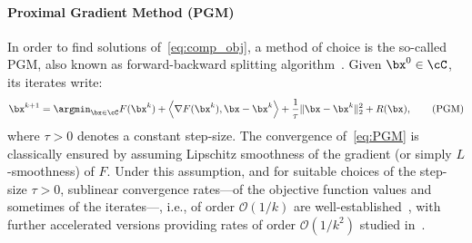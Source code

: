 \documentclass[11pt]{amsart}
\begin{document}
\paragraph{\textbf{Proximal Gradient Method (PGM)}} 
In order to find solutions of~\cref{eq:comp_obj}, a method of choice is the so-called PGM, also known as forward-backward splitting algorithm~\cite{CW2005,lions1979,Passty1979}. Given $\bx^0 \in \cC$, its iterates write: 
\begin{equation}\label{eq:PGM}
\bx^{k+1} = \argmin_{\bx \in \cC} F(\bx^k) + \left<\nabla F(\bx^{k}), \bx - \bx^{k} \right> + \frac1\tau \|\bx-\bx^k\|_2^2 + R(\bx),
\tag{PGM}
\end{equation}
where $\tau>0$ denotes a constant step-size. The convergence of~\cref{eq:PGM} is classically ensured by assuming Lipschitz smoothness of the gradient (or simply $L$-smoothness) of $F$. 
Under this assumption, and for suitable choices of the step-size $\tau>0$, sublinear convergence rates---of the objective function values and sometimes of the iterates---, i.e., of order $\mathcal{O}(1/k)$ are well-established~\cite{Nesterov2013}, with further accelerated versions providing rates of order $\mathcal{O}(1/k^2)$ studied in~\cite{Beck2009,Nesterov1983}.
\end{document}
